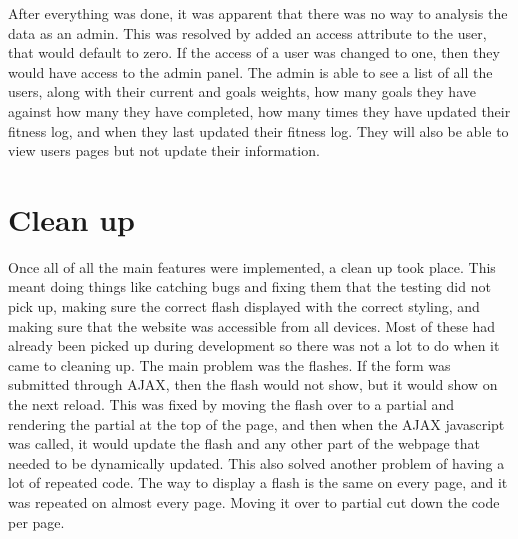 After everything was done, it was apparent that there was no way to analysis the data as an admin. This was resolved by added an access attribute to the user, that would default to zero. If the access of a user was changed to one, then they would have access to the admin panel. The admin is able to see a list of all the users, along with their current and goals weights, how many goals they have against how many they have completed, how many times they have updated their fitness log, and when they last updated their fitness log. They will also be able to view users pages but not update their information. \\

\section{Clean up}
Once all of all the main features were implemented, a clean up took place. This meant doing things like catching bugs and fixing them that the testing did not pick up, making sure the correct flash displayed with the correct styling, and making sure that the website was accessible from all devices. Most of these had already been picked up during development so there was not a lot to do when it came to cleaning up. The main problem was the flashes. If the form was submitted through AJAX, then the flash would not show, but it would show on the next reload. This was fixed by moving the flash over to a partial and rendering the partial at the top of the page, and then when the AJAX javascript was called, it would update the flash and any other part of the webpage that needed to be dynamically updated. This also solved another problem of having a lot of repeated code. The way to display a flash is the same on every page, and it was repeated on almost every page. Moving it over to partial cut down the code per page.\\

